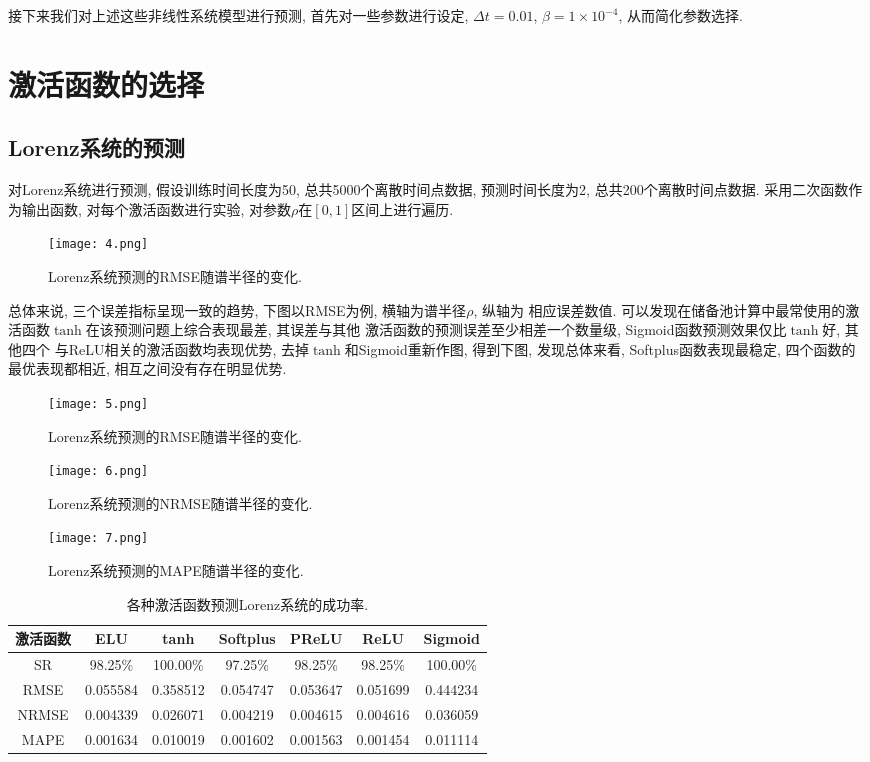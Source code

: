 \documentclass[notitlepage,cs4size,punct,oneside]{ctexrep}
\numberwithin{equation}{chapter}
\theoremstyle{mystyle}
\begin{document}
\bigskip
接下来我们对上述这些非线性系统模型进行预测, 首先对一些参数进行设定, 
$\Delta t=0.01$, $\beta=1\times10^{-4}$, 从而简化参数选择. 

\section{激活函数的选择}

\subsection{Lorenz系统的预测}
对Lorenz系统进行预测, 假设训练时间长度为50, 总共5000个离散时间点数据, 
预测时间长度为2, 总共200个离散时间点数据. 采用二次函数作为输出函数, 
对每个激活函数进行实验, 对参数$\rho$在$[0, 1]$区间上进行遍历. 

\begin{figure}[htbp]
    \centering
    \texttt{[image: 4.png]}
    \caption{Lorenz系统预测的RMSE随谱半径的变化.}
\end{figure}

总体来说, 三个误差指标呈现一致的趋势, 下图以RMSE为例, 横轴为谱半径$\rho$, 纵轴为
相应误差数值. 可以发现在储备池计算中最常使用的激活函数$\tanh$在该预测问题上综合表现最差, 其误差与其他
激活函数的预测误差至少相差一个数量级, Sigmoid函数预测效果仅比$\tanh$好, 其他四个
与ReLU相关的激活函数均表现优势, 去掉$\tanh$和Sigmoid重新作图, 得到下图, 发现总体来看, 
Softplus函数表现最稳定, 四个函数的最优表现都相近, 相互之间没有存在明显优势. 
\begin{figure}[htbp]
    \centering
    \texttt{[image: 5.png]}
    \caption{Lorenz系统预测的RMSE随谱半径的变化.}
\end{figure}
\begin{figure}[htbp]
    \centering
    \texttt{[image: 6.png]}
    \caption{Lorenz系统预测的NRMSE随谱半径的变化.}
\end{figure}
\begin{figure}[htbp]
    \centering
    \texttt{[image: 7.png]}
    \caption{Lorenz系统预测的MAPE随谱半径的变化.}
\end{figure}

\clearpage

\begin{table}[htbp]\centering    
    \caption{各种激活函数预测Lorenz系统的成功率.}
    \begin{tabular}{ccccccc}
    \hline\hline
    激活函数 & ELU & tanh & Softplus & PReLU & ReLU & Sigmoid \\
    \hline
    SR   & 98.25\% & 100.00\% & 97.25\% & 98.25\% & 98.25\% & 100.00\% \\
    RMSE   & 0.055584 & 0.358512 & 0.054747 & 0.053647 & 0.051699 & 0.444234 \\
    NRMSE   & 0.004339 & 0.026071 & 0.004219 & 0.004615 & 0.004616 & 0.036059 \\
    MAPE   & 0.001634 & 0.010019 & 0.001602 & 0.001563 & 0.001454 & 0.011114 \\
    \hline\hline
    \end{tabular}

\end{table}
\end{document}
